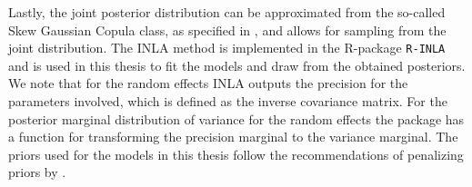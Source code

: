 Lastly, the joint posterior distribution can be approximated from the so-called Skew Gaussian Copula class, as specified in \citet{rue2021joint}, and allows for sampling from the joint distribution. 
The INLA method is implemented in the R-package \texttt{R-INLA} \citep{gomezrubio2020inla} and is used in this thesis to fit the models and draw from the obtained posteriors. We note that for the random effects INLA outputs the precision for the parameters involved, which is defined as the inverse covariance matrix. For the posterior marginal distribution of variance for the random effects the package has a function for transforming the precision marginal to the variance marginal. The priors used for the models in this thesis follow the recommendations of penalizing priors by \citet{simpson2017penalising}.








